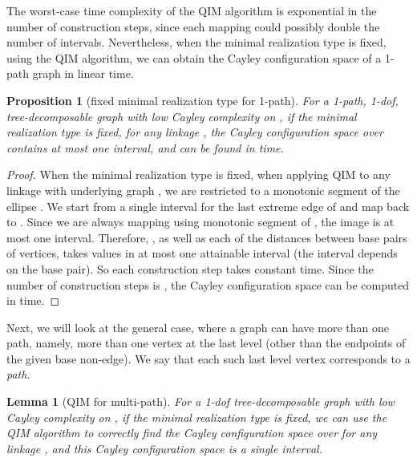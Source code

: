 \documentclass[secthm,amsthm,english]{article}
\newtheorem{lemma}{Lemma}
\newtheorem{proposition}{Proposition}
\theoremstyle{definition}
\theoremstyle{remark}
\begin{document}
The worst-case time complexity of the QIM algorithm is exponential in the number of construction steps, since each mapping could possibly double the number of intervals. 
Nevertheless, when the minimal realization type is fixed, using the QIM algorithm, we can obtain the Cayley configuration space of a 1-path graph in linear time. 

\begin{proposition}[fixed minimal realization type for 1-path]\label{obs:1-path}
For a 1-path, 1-dof, tree-decomposable graph 
with low Cayley complexity on , if the minimal realization type is fixed, 
for any linkage , 
the Cayley configuration space over  contains at most one interval, and can be found in  time. 
\end{proposition}

\begin{proof}
When the minimal realization type is fixed, 
when applying QIM to any linkage with underlying graph , 
we are restricted to a monotonic segment of the ellipse . We start from a single interval for the last extreme edge of  and map back to . 
Since we are always mapping using monotonic segment  of , the image is at most one interval. 
Therefore, , as well as each of the distances between base pairs of vertices, 
takes values in at most one attainable interval (the interval depends on the base pair). 
So each construction step takes constant time.  
Since the number of construction steps is , the Cayley configuration space can be computed in  time. 
\end{proof}










\noindent Next, we will look at the general case, 
where a graph can have more than one path, namely, 
more than one vertex at the last level  (other than the endpoints of the given base non-edge). 
We say that each such last level vertex corresponds to a \emph{path}. 




\begin{lemma}[QIM for multi-path] \label{lem: QIM-k-path}
For a 1-dof tree-decomposable graph  with low Cayley complexity on , 
if the minimal realization type is fixed, 
we can use the QIM algorithm to correctly find the Cayley configuration space over  for any linkage ,  
and this Cayley configuration space is a single interval.  
\end{lemma}
\end{document}

